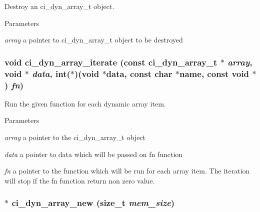 Destroy an ci\_\-dyn\_\-array\_\-t object. 
\begin{DoxyParams}{Parameters}
\item[{\em array}]a pointer to ci\_\-dyn\_\-array\_\-t object to be destroyed \end{DoxyParams}
\hypertarget{group__DYNAMIC__ARRAYS_ga8d67e00fea262a121c51d115782396dd}{
\subsubsection[{ci\_\-dyn\_\-array\_\-iterate}]{\setlength{\rightskip}{0pt plus 5cm}void ci\_\-dyn\_\-array\_\-iterate (const {\bf ci\_\-dyn\_\-array\_\-t} $\ast$ {\em array}, \/  void $\ast$ {\em data}, \/  int($\ast$)(void $\ast$data, const char $\ast$name, const void $\ast$) {\em fn})}}
\label{group__DYNAMIC__ARRAYS_ga8d67e00fea262a121c51d115782396dd}


Run the given function for each dynamic array item. 
\begin{DoxyParams}{Parameters}
\item[{\em array}]a pointer to the ci\_\-dyn\_\-array\_\-t object \item[{\em data}]a pointer to data which will be passed on fn function \item[{\em fn}]a pointer to the function which will be run for each array item. The iteration will stop if the fn function return non zero value. \end{DoxyParams}
\hypertarget{group__DYNAMIC__ARRAYS_ga1e963c7154158e101bebe374ff6ccb8b}{
\subsubsection[{ci\_\-dyn\_\-array\_\-new}]{$\ast$ ci\_\-dyn\_\-array\_\-new (size\_\-t {\em mem\_\-size})}}
\label{group__DYNAMIC__ARRAYS_ga1e963c7154158e101bebe374ff6ccb8b}


